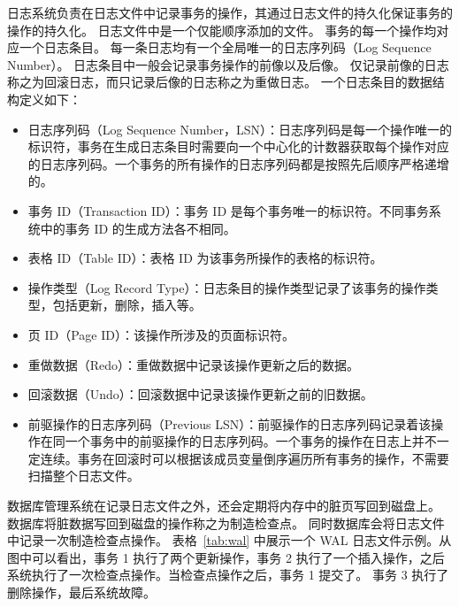 日志系统负责在日志文件中记录事务的操作，其通过日志文件的持久化保证事务的操作的持久化。
日志文件中是一个仅能顺序添加的文件。
事务的每一个操作均对应一个日志条目。
每一条日志均有一个全局唯一的日志序列码（Log Sequence Number）。
日志条目中一般会记录事务操作的前像以及后像。
仅记录前像的日志称之为回滚日志，而只记录后像的日志称之为重做日志。
一个日志条目的数据结构定义如下：
\begin{itemize}
    \item 日志序列码（Log Sequence Number，LSN）：日志序列码是每一个操作唯一的标识符，事务在生成日志条目时需要向一个中心化的计数器获取每个操作对应的日志序列码。一个事务的所有操作的日志序列码都是按照先后顺序严格递增的。
    \item 事务 ID（Transaction ID）：事务 ID 是每个事务唯一的标识符。不同事务系统中的事务 ID 的生成方法各不相同。
    \item 表格 ID（Table ID）：表格 ID 为该事务所操作的表格的标识符。
    \item 操作类型（Log Record Type）：日志条目的操作类型记录了该事务的操作类型，包括更新，删除，插入等。
    \item 页 ID（Page ID）：该操作所涉及的页面标识符。
    \item 重做数据（Redo）：重做数据中记录该操作更新之后的数据。
    \item 回滚数据（Undo）：回滚数据中记录该操作更新之前的旧数据。
    \item 前驱操作的日志序列码（Previous LSN）：前驱操作的日志序列码记录着该操作在同一个事务中的前驱操作的日志序列码。一个事务的操作在日志上并不一定连续。事务在回滚时可以根据该成员变量倒序遍历所有事务的操作，不需要扫描整个日志文件。
\end{itemize}


数据库管理系统在记录日志文件之外，还会定期将内存中的脏页写回到磁盘上。
数据库将脏数据写回到磁盘的操作称之为制造检查点。
同时数据库会将日志文件中记录一次制造检查点操作。
表格~\ref{tab:wal} 中展示一个 WAL 日志文件示例。从图中可以看出，事务 1 执行了两个更新操作，事务 2 执行了一个插入操作，之后系统执行了一次检查点操作。当检查点操作之后，事务 1 提交了。
事务 3 执行了删除操作，最后系统故障。


